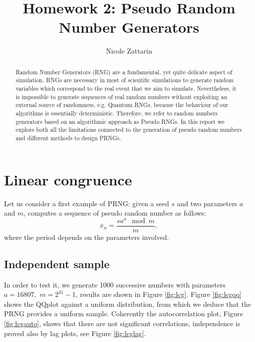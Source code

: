\documentclass[twoside,onecolumn]{article}
\title{Homework 2: Pseudo Random Number Generators } %
\author{Nicole Zattarin}
\date{}
\theoremstyle{definition}
\begin{document}
\maketitle

\begin{abstract}
Random Number Generators (RNG) are a fundamental, yet quite delicate aspect of simulation. RNGs are necessary in most of scientific simulations to generate random variables which correspond to the real event that we aim to simulate. Nevertheless, it is impossible to generate sequences of real random numbers without exploiting an external source of randomness, e.g. Quantum RNGs, because the behaviour of our algorithms is essentially deterministic. Therefore, we refer to random numbers generators based on an algorithmic approach as Pseudo RNGs. In this report we explore both all the limitations connected to the generation of pseudo random numbers and different methods to design PRNGs.

\end{abstract}



\section{Linear congruence}
Let us consider a first example of PRNG: given a seed $s$ and two parameters $a$ and $m$, computes a sequence of pseudo random number as follows:
\begin{equation}
x_n = \frac{sa^n\mod m}{m},
\end{equation}
where the period depends on the parameters involved. 
\subsection{Independent sample}

In order to test it, we generate 1000 successive numbers with parameters $a = 16807, \,\,m = 2^{31}- 1$, results are shown in Figure \ref{fig:lcg}. Figure \ref{fig:lcgqq} shows the QQplot against a uniform distribution, from which we deduce that the PRNG provides a uniform sample. Coherently the autocorrelation plot, Figure \ref{fig:lcgauto}, shows that there are not significant correlations, independence is proved also by lag plots, see Figure \ref{fig:lcglag}.
\end{document}
